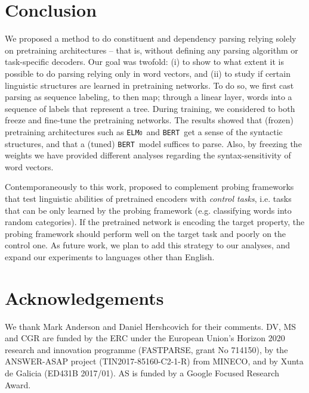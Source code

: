 \documentclass[letterpaper]{article} %
\newcommand{\citet}[1]{\citeauthor{#1} \shortcite{#1}}
\newcommand{\elmo}{\texttt{\textsc{ELMo}}}
\newcommand{\bert}{\texttt{\textsc{BERT}}}
\begin{document}
\section{Conclusion}

We proposed a method to do constituent and dependency parsing relying solely on pretraining architectures -- that is, without defining any parsing algorithm or task-specific decoders.
Our goal was twofold: (i) to show to what extent it is possible to do parsing relying only in word vectors, and  (ii) to study if certain linguistic structures are learned in pretraining networks. To do so, we first cast parsing as sequence labeling, to then map; through a linear layer, words into a sequence of labels that represent a tree. During training, we considered to both freeze and fine-tune the pretraining networks. The results showed that (frozen) pretraining architectures such as \elmo\ and \bert\ get a sense of the syntactic structures, and that a (tuned) \bert\ model suffices to parse.
Also, by freezing the weights we have provided different analyses regarding the syntax-sensitivity of word vectors.

Contemporaneously to this work, \citet{hewitt-liang-2019-designing} proposed to complement probing frameworks that test linguistic abilities of pretrained encoders with \emph{control tasks}, i.e. tasks that can be only learned by the probing framework (e.g. classifying words into random categories). If the pretrained network is encoding the target property, the probing framework should perform well on the target task and poorly on the control one. As future work, we plan to add this strategy to our analyses, and expand our experiments to languages other than English.

\section*{Acknowledgements}

We thank Mark Anderson and Daniel Hershcovich for their comments. DV, MS and CGR are funded by the ERC under the European Union's Horizon 2020 research and innovation programme (FASTPARSE, grant No 714150), by the
ANSWER-ASAP project (TIN2017-85160-C2-1-R) from MINECO, and by Xunta de Galicia (ED431B 2017/01). AS is funded by a Google Focused Research Award.
\end{document}

